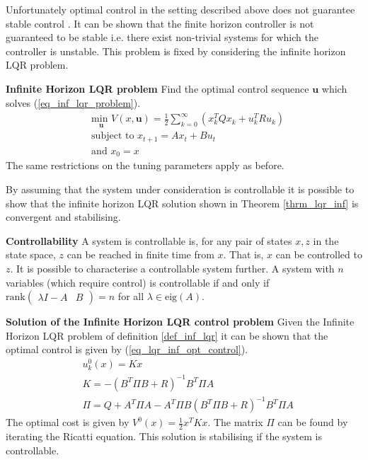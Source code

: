 Unfortunately optimal control in the setting described above does not guarantee stable control \cite{raw}. It can be shown that the finite horizon controller is not guaranteed to be stable i.e. there exist non-trivial systems for which the controller is unstable. This problem is fixed by considering the infinite horizon LQR problem. 
\begin{defn}
\textbf{Infinite Horizon LQR problem} Find the optimal control sequence $\mathbf{u}$ which solves (\ref{eq_inf_lqr_problem}).
\begin{equation}
\begin{aligned}
&\underset{\mathbf{u}}{\text{min }} V(x, \mathbf{u}) = \frac{1}{2}\sum_{k=0}^{\infty} \left( x_k^TQx_k + u_k^TRu_k \right) \\
&\text{subject to } x_{t+1} = Ax_t+Bu_t \\
&\text{and } x_0 = x
\end{aligned}
\label{eq_inf_lqr_problem}
\end{equation}
The same restrictions on the tuning parameters apply as before.
\label{def_inf_lqr}
\end{defn}
By assuming that the system under consideration is controllable it is possible to show that the infinite horizon LQR solution shown in Theorem \ref{thrm_lqr_inf} is convergent and stabilising.
\begin{defn}
\textbf{Controllability} A system is controllable is, for any pair of states $x,z$ in the state space, $z$ can be reached in finite time from $x$. That is, $x$ can be controlled to $z$. It is possible to characterise a controllable system further. A system with $n$ variables (which require control) is controllable if and only if $\text{rank}\begin{pmatrix}
\lambda I- A & B
\end{pmatrix} = n$ for all $\lambda \in \text{eig}(A)$. 
\end{defn}
\begin{thrm}
\textbf{Solution of the Infinite Horizon LQR control problem} Given the Infinite Horizon LQR problem of definition \ref{def_inf_lqr} it can be shown that the optimal control is given by (\ref{eq_lqr_inf_opt_control}).
\begin{equation}
\begin{aligned}
&u^0_{k}(x) = Kx \\
&K = -(B^T\Pi B+R)^{-1}B^T\Pi A \\
&\Pi = Q + A^T\Pi A-A^T\Pi B(B^T\Pi B+R)^{-1}B^T\Pi A  
\end{aligned}
\label{eq_lqr_inf_opt_control}
\end{equation}
The optimal cost is given by $V^0(x) = \frac{1}{2}x^TKx$. The matrix $\Pi$ can be found by iterating the Ricatti equation. This solution is stabilising if the system is controllable.
\label{thrm_lqr_inf}
\end{thrm}

